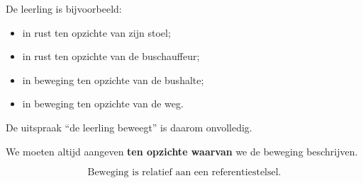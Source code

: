 \documentclass{ximera}
\begin{document}
\begin{oefening}{\oefB\ESS}
\begin{question}
\begin{oplossing}
De leerling is bijvoorbeeld:

\begin{itemize}
    \item in rust ten opzichte van zijn stoel;
    \item in rust ten opzichte van de buschauffeur;
    \item in beweging ten opzichte van de bushalte;
    \item in beweging ten opzichte van de weg.
\end{itemize}

De uitspraak ``de leerling beweegt'' is daarom onvolledig.

We moeten altijd aangeven \textbf{ten opzichte waarvan} we de beweging
beschrijven.

\[
\boxed{\text{Beweging is relatief aan een referentiestelsel.}}
\]
\end{oplossing}
\end{question}

\end{oefening}
\end{document}
